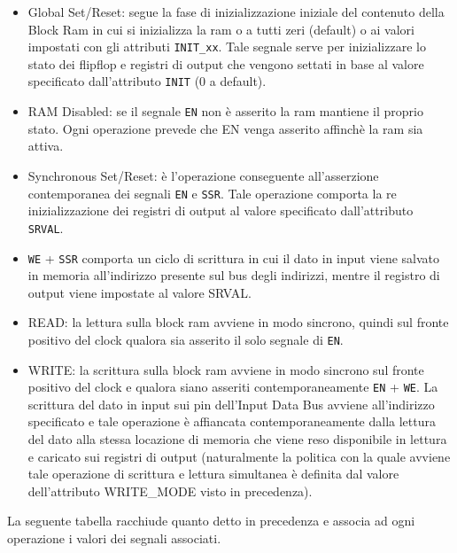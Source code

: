 \begin{itemize}
  \item Global Set/Reset: segue la fase di inizializzazione iniziale del contenuto della Block Ram in cui si inizializza la ram o a tutti zeri (default) o ai valori impostati con gli attributi \texttt{INIT\_xx}. Tale segnale serve per inizializzare lo stato dei flipflop e registri di output che vengono settati in base al valore specificato dall'attributo \texttt{INIT} (0 a default). 

\item RAM Disabled: se il segnale \texttt{EN} non  \`e asserito la ram mantiene il proprio stato. Ogni operazione prevede che EN venga asserito affinch\`e la ram sia attiva.

\item Synchronous Set/Reset: \`e l'operazione conseguente all'asserzione contemporanea dei segnali \texttt{EN} e \texttt{SSR}. Tale operazione comporta la re inizializzazione dei registri di output al valore specificato dall'attributo\texttt{ SRVAL}.

\item \texttt{WE} + \texttt{SSR} comporta un ciclo di scrittura in cui il dato in input viene salvato in memoria all'indirizzo presente sul bus degli indirizzi, mentre il registro di output viene impostate al valore SRVAL.

\item READ: la lettura sulla block ram avviene in modo sincrono, quindi sul fronte positivo del clock qualora sia asserito il solo segnale di \texttt{EN}.

\item WRITE: la scrittura sulla block ram avviene in modo sincrono sul fronte positivo del clock e qualora siano asseriti contemporaneamente \texttt{EN} + \texttt{WE}. La scrittura del dato in input sui pin dell'Input Data Bus avviene all'indirizzo specificato e tale operazione  \`e affiancata contemporaneamente dalla lettura del dato alla stessa locazione di memoria che viene reso disponibile in lettura e caricato sui registri di output (naturalmente la politica con la quale avviene tale operazione di scrittura e lettura simultanea  \`e definita dal valore dell'attributo WRITE\_MODE visto in precedenza).
\end{itemize}

La seguente tabella racchiude quanto detto in precedenza e associa ad ogni operazione i valori dei segnali associati.

